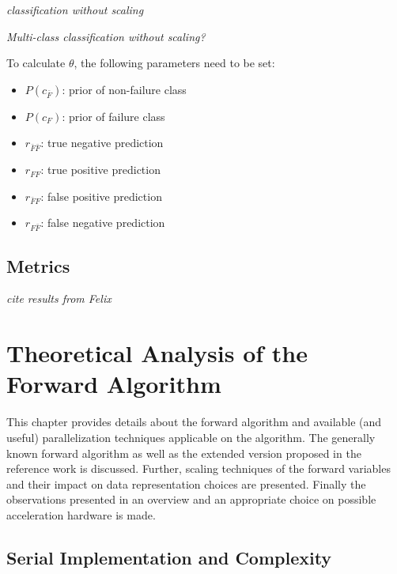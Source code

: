 \documentclass[mscthesis]{usiinfthesis}
\begin{document}
\emph{\color{red}classification without scaling}

\emph{\color{red}Multi-class classification without scaling?}

To calculate $ \theta $, the following parameters need to be set:
\begin{itemize}
    \item $ P(c_{\bar{F}}) $: prior of non-failure class
    \item $ P(c_F) $: prior of failure class
    \item $ r_{\bar{F}\bar{F}} $: true negative prediction
    \item $ r_{FF} $: true positive prediction
    \item $ r_{\bar{F}F} $: false positive prediction
    \item $ r_{F\bar{F}} $: false negative prediction
\end{itemize}

\section{Metrics}
\label{ch:event_metrics}

\emph{\color{red}cite results from Felix}

\chapter{Theoretical Analysis of the Forward Algorithm}
\label{ch:analysis}

This chapter provides details about the forward algorithm and available (and
useful) parallelization techniques applicable on the algorithm. The generally
known forward algorithm as well as the extended version proposed in the
reference work is discussed. Further, scaling techniques of the forward
variables and their impact on data representation choices are presented.
Finally the observations presented in an overview and an appropriate choice on
possible acceleration hardware is made.

\section{Serial Implementation and Complexity}
\label{ch:analysis_serial}
\end{document}
